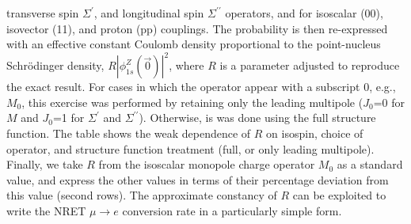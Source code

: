 \documentclass{book}[12pt]
\begin{document}
\begin{table}
{  transverse spin $\Sigma^\prime$, and longitudinal spin $\Sigma^{\prime \prime}$ operators, and for isoscalar (00), isovector (11), and proton (pp) couplings.
  The probability is then re-expressed with an effective constant Coulomb density proportional to the point-nucleus Schr\"{o}dinger density, $R |\phi_{1s}^Z(\vec{0})|^2$, where $R$ is a parameter adjusted to 
  reproduce the exact result.  For cases in which the operator appear with a subscript 0, e.g., $M_0$, this exercise was performed
  by retaining only the leading multipole ($J_0$=0 for $M$ and $J_0$=1 for $\Sigma^\prime$ and $\Sigma^{\prime \prime}$).  Otherwise, is was done using the full
  structure function.  The table shows the weak dependence of $R$ on isospin, choice of operator, and structure function treatment (full, or only leading multipole).  Finally, we take $R$
  from the isoscalar monopole charge operator $M_0$ as a standard value, and express the other values in terms of their percentage deviation from this value (second rows).   The approximate constancy
  of $R$ can be exploited to write the NRET $\mu \rightarrow e$ conversion rate in a particularly simple form.}
\end{table}
\end{document}
